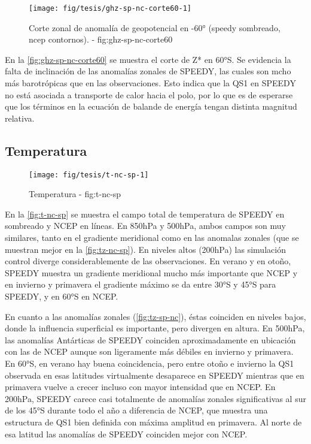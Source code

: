 \documentclass[spanish,a4paper]{book}
\begin{document}
\begin{figure}

{\centering \texttt{[image: fig/tesis/ghz-sp-nc-corte60-1]} 

}

\caption{Corte zonal de anomalía de geopotencial en -60° (speedy sombreado, ncep contornos). - fig:ghz-sp-nc-corte60}\label{fig:ghz-sp-nc-corte60}
\end{figure}

En la \autoref{fig:ghz-sp-nc-corte60} se muestra el corte de Z* en 60°S.
Se evidencia la falta de inclinación de las anomalías zonales de SPEEDY,
las cuales son mcho más barotrópicas que en las observaciones. Esto
indica que la QS1 en SPEEDY no está asociada a transporte de calor hacia
el polo, por lo que es de esperarse que los términos en la ecuación de
balande de energía tengan distinta magnitud
relativa.

\subsection{Temperatura}\label{temperatura-1}

\begin{landscape}\begin{figure}

{\centering \texttt{[image: fig/tesis/t-nc-sp-1]} 

}

\caption{Temperatura - fig:t-nc-sp}\label{fig:t-nc-sp}
\end{figure}
\end{landscape}

En la \autoref{fig:t-nc-sp} se muestra el campo total de temperatura de
SPEEDY en sombreado y NCEP en líneas. En 850hPa y 500hPa, ambos campos
son muy similares, tanto en el gradiente meridional como en las anomalas
zonales (que se muestran mejor en la \autoref{fig:tz-nc-sp}). En niveles
altos (200hPa) las simulación control diverge considerablemente de las
observaciones. En verano y en otoño, SPEEDY muestra un gradiente
meridional mucho más importante que NCEP y en invierno y primavera el
gradiente máximo se da entre 30°S y 45°S para SPEEDY, y en 60°S en NCEP.

En cuanto a las anomalías zonales (\autoref{fig:tz-sp-nc}), éstas
coinciden en niveles bajos, donde la influencia superficial es
importante, pero divergen en altura. En 500hPa, las anomalías Antárticas
de SPEEDY coinciden aproximadamente en ubicación con las de NCEP aunque
son ligeramente más débiles en invierno y primavera. En 60°S, en verano
hay buena coincidencia, pero entre otoño e invierno la QS1 observada en
esas latitudes virtualmente desaparece en SPEEDY mientras que en
primavera vuelve a crecer incluso con mayor intensidad que en NCEP. En
200hPa, SPEEDY carece casi totalmente de anomalías zonales
significativas al sur de los 45°S durante todo el año a diferencia de
NCEP, que muestra una estructura de QS1 bien definida con máxima
amplitud en primavera. Al norte de esa latitud las anomalías de SPEEDY
coinciden mejor con NCEP.
\end{document}
